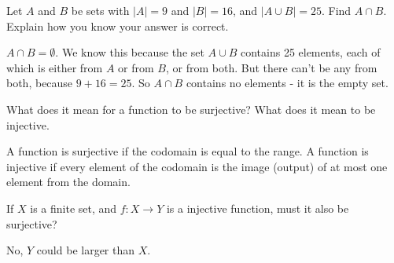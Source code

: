 \begin{questions}
\begin{answer}
\end{answer}


\question Let $A$ and $B$ be sets with $|A| = 9$ and $|B| = 16$, and $|A \cup B| = 25$.  Find $A \cap B$.  Explain how you know your answer is correct.

  \begin{answer}
     $A \cap B = \emptyset$.  We know this because the set $A \cup B$ contains 25 elements, each of which is either from $A$ or from $B$, or from both.  But there can't be any from both, because $9 + 16 = 25$.  So $A \cap B$ contains no elements - it is the empty set.
  \end{answer}


\question What does it mean for a function to be surjective?  What does it mean to be injective.

	\begin{answer}
		A function is surjective if the codomain is equal to the range.  A function is injective if every element of the codomain is the image (output) of at most one element from the domain.
	\end{answer}





\question If $X$ is a finite set, and $f: X \to Y$ is a injective function, must it also be surjective?

	\begin{answer}
		No, $Y$ could be larger than $X$.
	\end{answer}







\end{questions}
